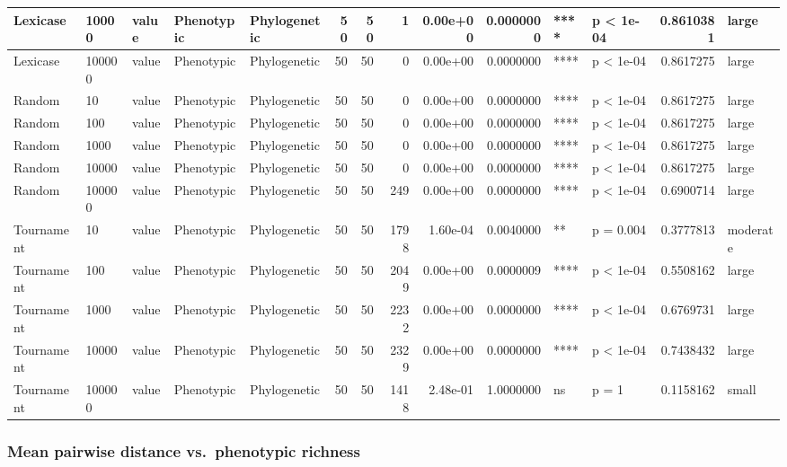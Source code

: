 \documentclass[]{book}
\begin{document}
\begin{table}
\begin{tabular}[t]{l|l|l|l|l|r|r|r|r|r|l|l|r|l}
\hline
Lexicase & 10000 & value & Phenotypic & Phylogenetic & 50 & 50 & 1 & 0.00e+00 & 0.0000000 & **** & p < 1e-04 & 0.8610381 & large\\
\hline
Lexicase & 100000 & value & Phenotypic & Phylogenetic & 50 & 50 & 0 & 0.00e+00 & 0.0000000 & **** & p < 1e-04 & 0.8617275 & large\\
\hline
Random & 10 & value & Phenotypic & Phylogenetic & 50 & 50 & 0 & 0.00e+00 & 0.0000000 & **** & p < 1e-04 & 0.8617275 & large\\
\hline
Random & 100 & value & Phenotypic & Phylogenetic & 50 & 50 & 0 & 0.00e+00 & 0.0000000 & **** & p < 1e-04 & 0.8617275 & large\\
\hline
Random & 1000 & value & Phenotypic & Phylogenetic & 50 & 50 & 0 & 0.00e+00 & 0.0000000 & **** & p < 1e-04 & 0.8617275 & large\\
\hline
Random & 10000 & value & Phenotypic & Phylogenetic & 50 & 50 & 0 & 0.00e+00 & 0.0000000 & **** & p < 1e-04 & 0.8617275 & large\\
\hline
Random & 100000 & value & Phenotypic & Phylogenetic & 50 & 50 & 249 & 0.00e+00 & 0.0000000 & **** & p < 1e-04 & 0.6900714 & large\\
\hline
Tournament & 10 & value & Phenotypic & Phylogenetic & 50 & 50 & 1798 & 1.60e-04 & 0.0040000 & ** & p = 0.004 & 0.3777813 & moderate\\
\hline
Tournament & 100 & value & Phenotypic & Phylogenetic & 50 & 50 & 2049 & 0.00e+00 & 0.0000009 & **** & p < 1e-04 & 0.5508162 & large\\
\hline
Tournament & 1000 & value & Phenotypic & Phylogenetic & 50 & 50 & 2232 & 0.00e+00 & 0.0000000 & **** & p < 1e-04 & 0.6769731 & large\\
\hline
Tournament & 10000 & value & Phenotypic & Phylogenetic & 50 & 50 & 2329 & 0.00e+00 & 0.0000000 & **** & p < 1e-04 & 0.7438432 & large\\
\hline
Tournament & 100000 & value & Phenotypic & Phylogenetic & 50 & 50 & 1418 & 2.48e-01 & 1.0000000 & ns & p = 1 & 0.1158162 & small\\
\hline
\end{tabular}
\end{table}

\hypertarget{mean-pairwise-distance-vs.phenotypic-richness}{%
\subsubsection{Mean pairwise distance vs.~phenotypic richness}\label{mean-pairwise-distance-vs.phenotypic-richness}}
\end{document}
